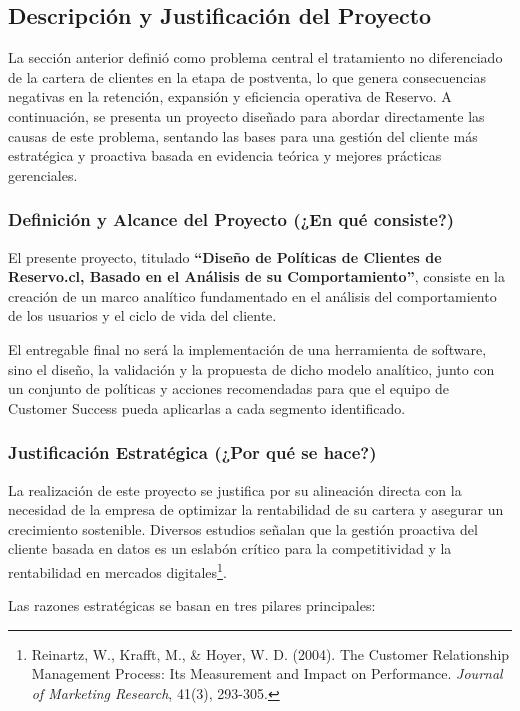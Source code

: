 \subsection{Descripción y Justificación del Proyecto}

La sección anterior definió como problema central el tratamiento no diferenciado de la cartera de clientes en la etapa de postventa, lo que genera consecuencias negativas en la retención, expansión y eficiencia operativa de Reservo. A continuación, se presenta un proyecto diseñado para abordar directamente las causas de este problema, sentando las bases para una gestión del cliente más estratégica y proactiva basada en evidencia teórica y mejores prácticas gerenciales.

\subsubsection{Definición y Alcance del Proyecto (¿En qué consiste?)}

El presente proyecto, titulado \textbf{“Diseño de Políticas de Clientes de Reservo.cl, Basado en el Análisis de su Comportamiento”}, consiste en la creación de un marco analítico fundamentado en el análisis del comportamiento de los usuarios y el ciclo de vida del cliente.  

El entregable final no será la implementación de una herramienta de software, sino el diseño, la validación y la propuesta de dicho modelo analítico, junto con un conjunto de políticas y acciones recomendadas para que el equipo de Customer Success pueda aplicarlas a cada segmento identificado.

\subsubsection{Justificación Estratégica (¿Por qué se hace?)}

La realización de este proyecto se justifica por su alineación directa con la necesidad de la empresa de optimizar la rentabilidad de su cartera y asegurar un crecimiento sostenible. Diversos estudios señalan que la gestión proactiva del cliente basada en datos es un eslabón crítico para la competitividad y la rentabilidad en mercados digitales\footnote{Reinartz, W., Krafft, M., \& Hoyer, W. D. (2004). The Customer Relationship Management Process: Its Measurement and Impact on Performance. \textit{Journal of Marketing Research}, 41(3), 293-305.}.  

Las razones estratégicas se basan en tres pilares principales:  

